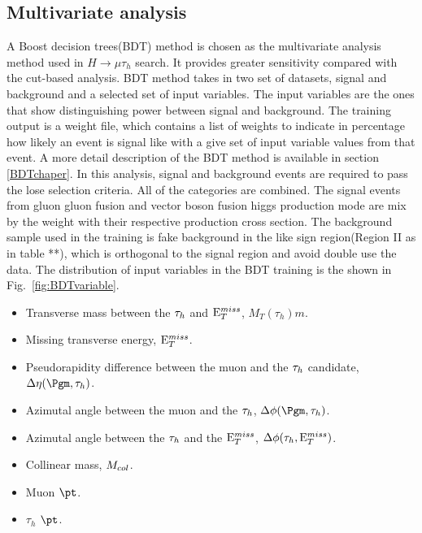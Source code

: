 \subsection{Multivariate analysis}
A Boost decision trees(BDT) method is chosen as the multivariate analysis method used in  $H\rightarrow\mu\tau_h$ search. It provides greater sensitivity compared with the cut-based analysis. BDT method takes in two set of datasets, signal and background and a selected set of input variables. The input variables are the ones that show distinguishing power between signal and background.  The training output is a weight file, which contains a list of weights to indicate in percentage how likely an event is signal like with a give set of input variable values from that event. A more detail description of the BDT method is available in section \ref{BDTchaper}.  In this analysis, signal and background events are required to pass the lose selection criteria. All of the categories are combined. The signal events from gluon gluon fusion and vector boson fusion higgs production mode are mix by the weight with their respective production cross section. The background sample used in the training is fake background in the like sign region(Region II as in table **),  which is orthogonal to the signal region and avoid double use the data.  The distribution of input variables in the BDT training is the shown in Fig.~\ref{fig:BDTvariable}.

\begin{itemize}
\item Transverse mass between the $\tau_{h}$ and $\mathrm{E}_{T}^{miss}$, $M_{T}(\tau_{h})m$.
\item Missing transverse energy, $\mathrm{E}_{T}^{miss}$.
\item Pseudorapidity difference between the muon  and the $\tau_{h}$ candidate, $\Delta\eta(\Pgm, \tauh)$.
\item Azimutal angle between the muon and the $\tau_{h}$, $\Delta\phi(\Pgm,\tauh)$.
\item Azimutal angle between the $\tau_{h}$ and the $\mathrm{E}_{T}^{miss}$, $\Delta\phi(\tau_h,\mathrm{E}_{T}^{miss})$.
\item Collinear mass, $M_{col}$.
\item Muon $\pt$.
\item $\tau_h$ $\pt$.
\end{itemize}

